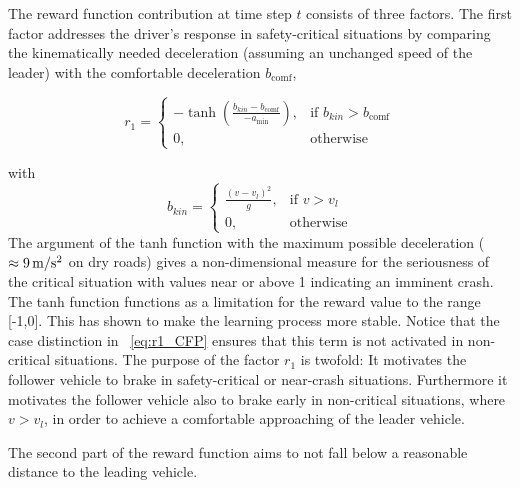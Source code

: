 \documentclass[review]{elsarticle}
\providecommand{\martinc}[1]{}                  %
\providecommand{\sub}[1]{_{\mathrm{#1}}}  %
\providecommand{\3}{{\ss}}
\begin{document}
The reward function contribution at time step $t$ consists of three factors. 
The first factor addresses the driver's
response in safety-critical situations by comparing the
kinematically needed deceleration (assuming an
unchanged speed of the leader) with the
comfortable deceleration $b\sub{comf}$,



\begin{equation}
\label{eq:r1_CFP}
r_1 = 
\begin{cases}
-\tanh\left(\frac{b_{kin}-b\sub{comf}}{-a\sub{min}}\right),& \text{if } b_{kin}>b\sub{comf}\\
0,              & \text{otherwise}
\end{cases}
\end{equation}

with
\begin{equation}
\label{bkin}
b_{kin} = 
\begin{cases}
\frac{(v-v_l)^2}{g},& \text{if } v>v_l\\
0,              & \text{otherwise}
\end{cases}
\end{equation}
The argument of the tanh function with  the
maximum possible deceleration ($\approx \unit[9]{m/s^2}$ on dry roads) gives a
non-dimensional measure for the seriousness of the critical situation
with values 
near or above 1 indicating an imminent crash.  The tanh function functions as a limitation for the reward value to the range [-1,0]. This has shown to make the learning process more stable. Notice that the case distinction in ~\eqref{eq:r1_CFP}  ensures that
this term is not activated in non-critical situations. The purpose of
the factor $r_1$ is twofold: It motivates the follower vehicle to
brake in safety-critical or near-crash situations.  Furthermore it
motivates the follower vehicle also to brake early in non-critical
situations, where $ v>v_l$, in order to achieve a comfortable
approaching of the leader vehicle.\martinc{Nicht wirklich, weil diese
  Funktion nur in zumindest milde kritischen Situationen $b\sub{kin}>b\sub{comf}$ anspringt.}

The second part of the reward function aims to not fall below a reasonable
distance to the leading vehicle.
\end{document}
